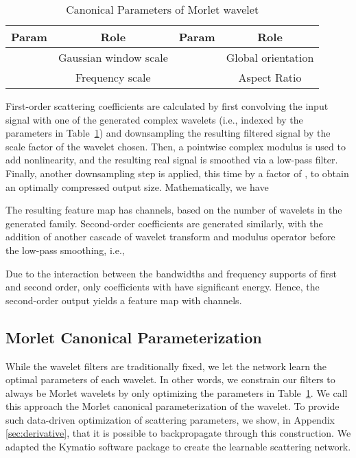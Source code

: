 \documentclass[10pt,twocolumn,letterpaper]{article}
\begin{document}
\begin{table}[tb]
\centering
\small
\caption{Canonical Parameters of Morlet wavelet\vspace{-5pt}}
    \begin{tabular}{|c|c||c|c|}
     \hline Param  &  Role &  Param  &  Role\\\hline
   & Gaussian window scale & 
         & Global orientation \\
      \hline    & Frequency scale & 
         & Aspect Ratio \\
      \hline \end{tabular}
    \label{tab:params}
\vspace{-15pt}
\end{table}


First-order scattering coefficients are calculated by first convolving the input signal with one of the generated complex wavelets (i.e., indexed by the parameters in Table~\ref{tab:params}) and downsampling the resulting filtered signal by the scale factor  of the wavelet chosen. Then, a pointwise complex modulus is used to add nonlinearity, and the resulting real signal is smoothed via a low-pass filter. Finally, another downsampling step is applied, this time by a factor of , to obtain an optimally compressed output size. Mathematically, we have 

The resulting feature map has  channels, based on the number of wavelets in the generated family. Second-order coefficients are generated similarly, with the addition of another cascade of wavelet transform and modulus operator before the low-pass smoothing, i.e.,

Due to the interaction between the bandwidths and frequency supports of first and second order, only coefficients with  have significant energy. Hence, the second-order output yields a feature map with 
 channels. 

\subsection{Morlet Canonical Parameterization}
\label{sec:parametricoptim}
While the wavelet filters are traditionally fixed, we let the network learn the optimal parameters of each wavelet. In other words, we constrain our filters to always be Morlet wavelets by only optimizing the parameters in Table~\ref{tab:params}. We call this approach the Morlet canonical parameterization of the wavelet. To provide such data-driven optimization of scattering parameters, we show, in Appendix \ref{sec:derivative}, that it is possible to backpropagate through this construction. We adapted the Kymatio software package \cite{andreux2020kymatio} to create the learnable scattering network.
\end{document}
